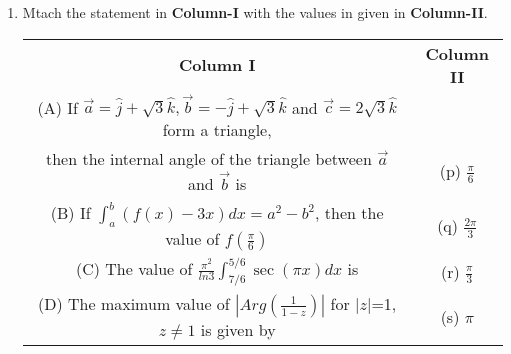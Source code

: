 \begin{enumerate}[label=\arabic*.,ref=\thesubsection.\theenumi]
\item Mtach the statement in \textbf{Column-I} with the values in given in \textbf{Column-II}.
\begin{table}[ht!]
\centering
\begin{tabular}{c c} 
 \textbf{Column I} & \textbf{Column II}\\ [0.5ex] 
 (A) If $\overrightarrow{a}=\hat{j}+\sqrt{3}\hat{k}, \overrightarrow{b}
     =-\hat{j}+\sqrt{3}\hat{k}$ and $\overrightarrow{c}=2\sqrt{3}\hat{k}$
     form a triangle,\\ then the internal angle of the triangle between
     $\overrightarrow{a}$ and $\overrightarrow{b}$ is                             &(p) $\frac{\pi}{6}$\\ 
 (B) If $\int_{a}^{b}(f(x)-3x)dx=a^2-b^2$, then the value of $f(\frac{\pi}{6})$   &(q) $\frac{2\pi}{3}$\\
 (C) The value of $\frac{\pi^{2}}{ln3}\int_{7/6}^{5/6}\sec(\pi x)dx$ is           &(r) $\frac{\pi}{3}$\\
 (D) The maximum value of $|Arg(\frac{1}{1-z})|$ for $|z|$=1, 
     $z \neq 1$ is given by                                                       &(s) $\pi$\\[1ex] 

\end{tabular}
\end{table}


\end{enumerate}
